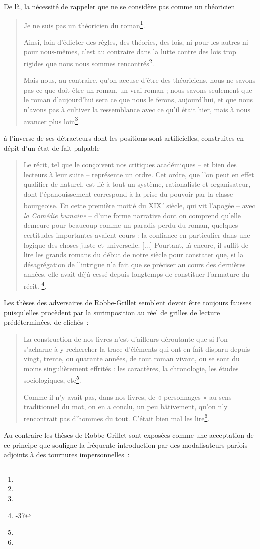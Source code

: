 De là, la nécessité de rappeler que \robbe{} ne se considère pas comme un théoricien
\begin{quote}
    Je ne suis pas un théoricien du roman\footnote{}.


    Ainsi, loin d’édicter des règles, des théories, des lois, ni pour les autres ni pour nous-mêmes, c’est au contraire dans la lutte contre des lois trop rigides que nous nous sommes rencontrés\footnote{}.

    Mais nous, au contraire, qu’on accuse d’être des théoriciens, nous ne savons pas ce que doit être un roman, un vrai roman ; nous savons seulement que le roman d’aujourd’hui sera ce que nous le ferons, aujourd’hui, et que nous n’avons pas à cultiver la ressemblance avec ce qu’il était hier, mais à nous avancer plus loin\footnote{}.
\end{quote}
à l'inverse de ses détracteurs dont les positions sont artificielles, construites en dépit d'un état de fait palpable
\begin{quote}
    Le récit, tel que le conçoivent nos critiques académiques – et bien des lecteurs à leur suite – représente un ordre. Cet ordre, que l’on peut en effet qualifier de naturel, est lié à tout un système, rationaliste et organisateur, dont l’épanouissement correspond à la prise du pouvoir par la classe bourgeoise. En cette première moitié du \textsc{XIX}\textsuperscript{e} siècle, qui vit l’apogée – avec \textit{la Comédie humaine} – d’une forme narrative dont on comprend qu’elle demeure pour beaucoup comme un paradis perdu du roman, quelques certitudes importantes avaient cours : la confiance en particulier dans une logique des choses juste et universelle.
    [...]
    Pourtant, là encore, il suffit de lire les grands romans du début de notre siècle pour constater que, si la désagrégation de l’intrigue n’a fait que se préciser au cours des dernières années, elle avait déjà cessé depuis longtemps de constituer l’armature du récit.
    \footnote{-37}.
\end{quote}
Les thèses des adversaires de Robbe-Grillet semblent devoir être toujours fausses puisqu'elles procèdent par la surimposition au réel de grilles de lecture prédéterminées, de clichés~:
\begin{quote}
    La construction de nos livres n’est d’ailleurs déroutante que si l’on s’acharne à y rechercher la trace d’éléments qui ont en fait disparu depuis vingt, trente, ou quarante années, de tout roman vivant, ou se sont du moins singulièrement effrités : les caractères, la chronologie, les études sociologiques, etc\footnote{}.

    Comme il n’y avait pas, dans nos livres, de « personnages » au sens traditionnel du mot, on en a conclu, un peu hâtivement, qu’on n’y rencontrait pas d’hommes du tout. C’était bien mal les lire\footnote{}.
\end{quote}
Au contraire les thèses de Robbe-Grillet sont exposées comme une acceptation de ce principe que souligne la fréquente introduction par des modalisateurs parfois adjoints à des tournures impersonnelles~:

